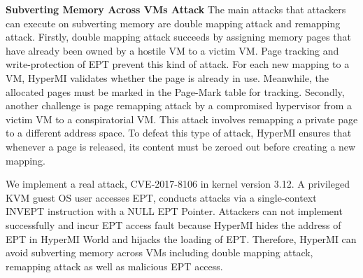 \documentclass[conference]{IEEEtran}
\begin{document}




\textbf{Subverting Memory Across VMs Attack}
%
The main attacks that attackers can execute on subverting memory are double mapping attack and remapping attack.
Firstly, double mapping attack succeeds by assigning memory pages that have already been owned by a hostile VM to a victim VM. Page tracking and write-protection of EPT prevent this kind of attack. For each new mapping to a VM, HyperMI validates whether the page is already in use. Meanwhile, the allocated pages must be marked in the Page-Mark table for tracking. Secondly, another challenge is page remapping attack by a compromised hypervisor from a victim VM to a conspiratorial VM. This attack involves remapping a private page to a different address space. To defeat this type of attack, HyperMI ensures that whenever a page is released, its content must be zeroed out before creating a new mapping.


We implement a real attack, CVE-2017-8106 in kernel version 3.12. A privileged KVM guest OS user accesses EPT, conducts attacks via a single-context INVEPT instruction with a NULL EPT Pointer. Attackers can not implement successfully and incur EPT access fault because HyperMI hides the address of EPT in HyperMI World and hijacks the loading of EPT. Therefore, HyperMI can avoid subverting memory across VMs including double mapping attack, remapping attack as well as malicious EPT access.
\end{document}
